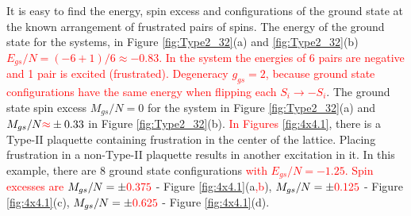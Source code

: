 \documentclass[preprint,12pt]{elsarticle}
\begin{document}
	
	It is easy to find the energy, spin excess and configurations of the ground state at the known arrangement of frustrated pairs of spins. The energy of the ground state for the systems, in Figure \ref{fig:Type2_32}(a) and \ref{fig:Type2_32}(b) \textcolor{red}{$E_{gs}/N=(-6+1)/6\approx-0.83$. In the system the energies of 6 pairs are negative and 1 pair is excited (frustrated).} \textcolor{red}{Degeneracy $g_{gs}=2$, because ground state configurations have the same energy when flipping each $S_i \rightarrow -S_i$}. The ground state spin excess $M_{gs}/N=0$ for the system in Figure \ref{fig:Type2_32}(a) and $M_{gs}/N\textcolor{red}{\approx}\pm 0.33$ in Figure \ref{fig:Type2_32}(b).
	\textcolor{red}{In Figures \ref{fig:4x4.1}}, there is a Type-II plaquette containing frustration in the center of the lattice. Placing frustration in a non-Type-II plaquette results in another excitation in it. In this example, there are 8 ground state configurations \textcolor{red}{with $E_{gs}/N=-1.25$. Spin excesses are} $M_{gs}/N=\pm\textcolor{red}{0.375}$ - Figure \ref{fig:4x4.1}(a\textcolor{red}{,b}), $M_{gs}/N=\pm \textcolor{red}{0.125}$ - Figure \ref{fig:4x4.1}(c), $M_{gs}/N=\pm \textcolor{red}{0.625}$ - Figure \ref{fig:4x4.1}(d).
	
\end{document}

